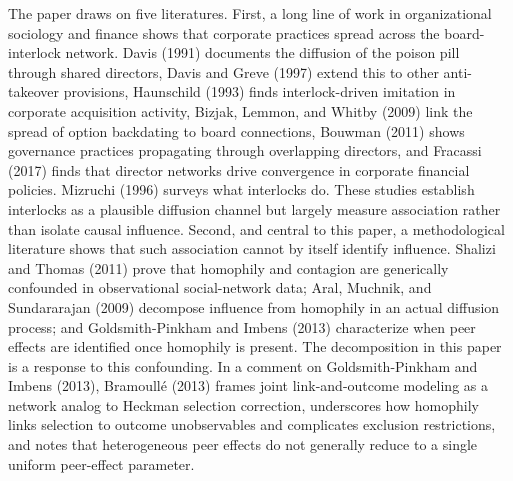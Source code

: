 \documentclass[
  a4paper,
]{article}
\begin{document}
The paper draws on five literatures. First, a long line of work in
organizational sociology and finance shows that corporate practices
spread across the board-interlock network. Davis (1991) documents the
diffusion of the poison pill through shared directors, Davis and Greve
(1997) extend this to other anti-takeover provisions, Haunschild (1993)
finds interlock-driven imitation in corporate acquisition activity,
Bizjak, Lemmon, and Whitby (2009) link the spread of option backdating
to board connections, Bouwman (2011) shows governance practices
propagating through overlapping directors, and Fracassi (2017) finds
that director networks drive convergence in corporate financial
policies. Mizruchi (1996) surveys what interlocks do. These studies
establish interlocks as a plausible diffusion channel but largely
measure association rather than isolate causal influence. Second, and
central to this paper, a methodological literature shows that such
association cannot by itself identify influence. Shalizi and Thomas
(2011) prove that homophily and contagion are generically confounded in
observational social-network data; Aral, Muchnik, and Sundararajan
(2009) decompose influence from homophily in an actual diffusion
process; and Goldsmith-Pinkham and Imbens (2013) characterize when peer
effects are identified once homophily is present. The decomposition in
this paper is a response to this confounding. In a comment on
Goldsmith-Pinkham and Imbens (2013), Bramoullé (2013) frames joint
link-and-outcome modeling as a network analog to Heckman selection
correction, underscores how homophily links selection to outcome
unobservables and complicates exclusion restrictions, and notes that
heterogeneous peer effects do not generally reduce to a single uniform
peer-effect parameter.
\end{document}

